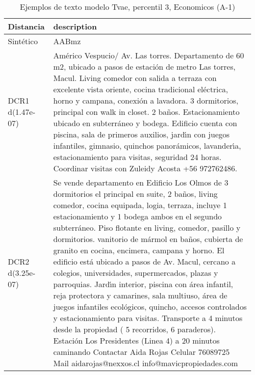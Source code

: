 \begin{table}[H]
\centering
\fontsize{10}{14}\selectfont
\caption{Ejemplos de texto modelo Tvae, percentil 3, Economicos (A-1)}
\label{table-example-economicos-a-1-tvae-3p-text}
\begin{tabular}{|l|m{35em}|}
\hline
\rowcolor[gray]{0.8}
Distancia & description \\
\hline Sintético & AABmz \\
\hline DCR1 d(1.47e-07) & Am\'erico Vespucio/ Av. Las torres. Departamento de 60 m2, ubicado a pasos de estaci\'on de metro Las torres, Macul. Living comedor con salida a terraza con excelente vista oriente, cocina tradicional el\'ectrica, horno y campana, conexi\'on a lavadora. 3 dormitorios, principal con walk in closet. 2 ba\~nos. Estacionamiento ubicado en subterr\'aneo y bodega. Edificio cuenta con piscina, sala de primeros auxilios, jard{\'\i}n con juegos infantiles, gimnasio, quinchos panor\'amicos, lavander{\'\i}a, estacionamiento para visitas, seguridad 24 horas. Coordinar visitas con Zuleidy Acosta +56 972762486. \\
\hline DCR2 d(3.25e-07) & Se vende departamento en Edificio Los Olmos de 3 dormitorios el principal en suite, 2 ba\~nos, living comedor, cocina equipada, logia, terraza, incluye 1 estacionamiento y 1 bodega ambos en el segundo subterr\'aneo. Piso flotante en living, comedor, pasillo y dormitorios. vanitorio de m\'armol en ba\~nos, cubierta de granito en cocina, encimera, campana y horno. El edificio est\'a ubicado a pasos de Av. Macul, cercano a colegios, universidades, supermercados, plazas y parroquias. Jard{\'\i}n interior, piscina con \'area infantil, reja protectora y camarines, sala multiuso, \'area de juegos infantiles ecol\'ogicos, quincho, accesos controlados y estacionamiento para visitas. Transporte a 4 minutos desde la propiedad ( 5 recorridos, 6 paraderos). Estaci\'on Los Presidentes (Linea 4) a 20 minutos caminando Contactar Aida Rojas Celular 76089725 Mail aidarojas@nexxos.cl info@mavicpropiedades.com \\
\hline
\end{tabular}
\end{table}
